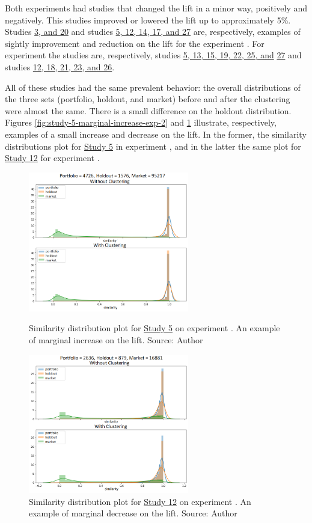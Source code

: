 Both experiments had studies that changed the lift in a minor way, positively and negatively. This studies improved or lowered the lift up to approximately 5\%. Studies \underline{3, and 20} and studies \underline{5, 12, 14, 17, and 27} are, respectively, examples of sightly improvement and reduction on the lift for the experiment \nameExperimentI{}. For experiment \nameExperimentII{} the studies are, respectively, studies \underline{5, 13, 15, 19, 22, 25, and}
\underline{27} and studies \underline{12, 18, 21, 23, and 26}.

All of these studies had the same prevalent behavior: the overall distributions of the three sets (portfolio, holdout, and market) before and after the clustering were almost the same. There is a small difference on the holdout distribution. Figures \ref{fig:study-5-marginal-increase-exp-2} and \ref{fig:study-12-marginal-decrease-exp-1} illustrate, respectively, examples of a small increase and decrease on the lift. In the former, the similarity distributions plot for \underline{Study 5} in experiment \nameExperimentII{}, and in the latter the same plot for \underline{Study 12} for experiment \nameExperimentI{}.

\begin{figure}[h]
   \centering
   \includegraphics[width=7cm]{fig/ch4-study-5-marginal-increase-exp-2.png}
   \caption{Similarity distribution plot for \underline{Study 5} on experiment \nameExperimentII{}. An example of marginal increase on the lift. Source: Author}
   \label{fig:study-5-marginal-increase-exp-2}

   \includegraphics[width=7cm]{fig/ch4-study-12-marginal-decrease-exp-1.png}
   \caption{Similarity distribution plot for \underline{Study 12} on experiment \nameExperimentI{}. An example of marginal decrease on the lift. Source: Author}
   \label{fig:study-12-marginal-decrease-exp-1}
\end{figure}

